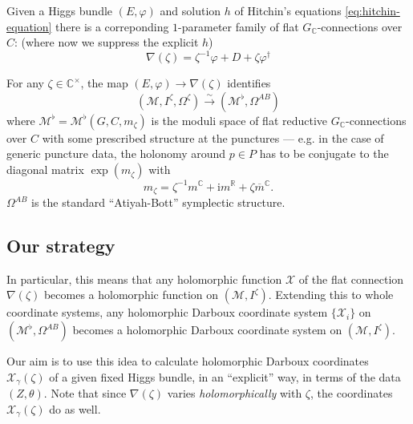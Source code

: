 \documentclass[12pt,letterpaper,reqno]{article}
\numberwithin{equation}{section}
\newcommand{\cM}{\ensuremath{\mathcal M}}
\newcommand{\cX}{\ensuremath{\mathcal X}}
\newcommand{\R}{\ensuremath{\mathbb R}}
\newcommand{\C}{\ensuremath{\mathbb C}}
\newcommand{\I}{{\mathrm i}}
\newcommand{\simarrow}{\xrightarrow\sim}
\newcommand{\ti}[1]{\textit{#1}}
\begin{document}
Given a Higgs bundle $(E,\varphi)$ and 
solution $h$ of Hitchin's equations \eqref{eq:hitchin-equation}
there is a correponding $1$-parameter family of flat
$G_\C$-connections over $C$:
(where now we suppress the explicit $h$)
\begin{equation}
  \nabla(\zeta) = \zeta^{-1} \varphi + D + \zeta \varphi^\dagger
\end{equation}

\begin{prop} For any $\zeta \in \C^\times$,
the map $(E,\varphi) \to \nabla(\zeta)$ identifies
\begin{equation}
  (\cM, I^\zeta, \Omega^\zeta) \simarrow (\cM^\flat, \Omega^{AB})
\end{equation}
where $\cM^\flat = \cM^\flat(G, C, m_\zeta)$
is the moduli space of flat reductive 
$G_\C$-connections
over $C$ with some prescribed structure at the punctures ---
e.g. in the case of generic puncture data,
the holonomy around $p \in P$ has to be conjugate to 
the diagonal matrix $\exp(m_\zeta)$ with
\begin{equation}
m_\zeta = \zeta^{-1} m^\C + \I m^\R + \zeta \overline{m}^\C. 
\end{equation}
$\Omega^{AB}$ is the standard ``Atiyah-Bott'' symplectic
structure.
\end{prop}


\subsection{Our strategy}

In particular, this means that any holomorphic function $\cX$ of
the flat connection $\nabla(\zeta)$ becomes a holomorphic
function on $(\cM, I^\zeta)$.
Extending this to whole coordinate systems, any holomorphic 
Darboux coordinate system $\{\cX_i\}$ on $(\cM^\flat, \Omega^{AB})$
becomes a holomorphic Darboux coordinate system on
$(\cM, I^\zeta)$.

Our aim is to use this idea to calculate holomorphic Darboux
coordinates $\cX_\gamma(\zeta)$ of a given fixed Higgs bundle,
in an ``explicit'' way,
in terms of the data $(Z, \theta)$.
Note that since $\nabla(\zeta)$ varies
\ti{holomorphically} with $\zeta$, the coordinates
$\cX_\gamma(\zeta)$ do as well.
\end{document}

